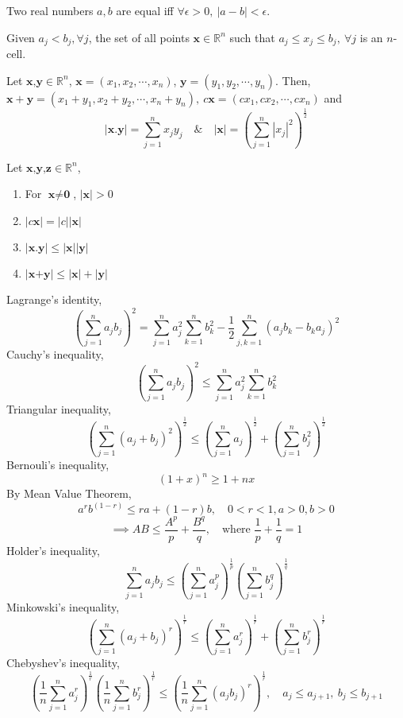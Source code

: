 	\begin{remark}
		Two real numbers $a,b$ are equal iff $\forall \epsilon > 0,\ |a-b|<\epsilon$.
	\end{remark}

	\begin{definition}
		Given $a_j < b_j, \forall j$, the set of all points $\textbf{x} \in \mathbb{R}^n$ such that $a_j \le x_j \le b_j,\ \forall j$ is an $n$-cell.
	\end{definition}

	\begin{definition}
		Let $\textbf{x,y} \in \mathbb{R}^n$, $ \textbf{x} = (x_1, x_2, \cdots, x_n)$, $\textbf{y} = (y_1, y_2, \cdots, y_n)$. Then, $\textbf{x} + \textbf{y} = (x_1 + y_1, x_2 + y_2, \cdots, x_n + y_n),\ c\textbf{x} = (cx_1, cx_2, \cdots, cx_n)$ and
		$$|\textbf{x}.\textbf{y}| = \sum_{j=1}^n x_j y_j \quad \& \quad | \textbf{x} | = \left( \sum_{j=1}^n |x_j|^2 \right)^\frac{1}{2}$$
	\end{definition}

	\begin{remark} Let $\textbf{x,y,z} \in \mathbb{R}^n$,
		\begin{enumerate}
			\item For $\textbf{x} \ne \textbf{0}$, $|\textbf{x}| > 0$
			\item $|c\textbf{x}| = |c||\textbf{x}|$
			\item $|\textbf{x.y}| \le |\textbf{x}||\textbf{y}|$
			\item $|\textbf{x+y}| \le |\textbf{x}|+|\textbf{y}|$
		\end{enumerate}
	\end{remark}

	Lagrange's identity, $$\left( \sum_{j = 1}^n a_jb_j \right)^2 = \sum_{j = 1}^n a_j^2 \sum_{k = 1}^n b_k^2 - \frac{1}{2}\sum_{j,k=1}^n (a_jb_k - b_ka_j)^2$$
	Cauchy's inequality, $$\left( \sum_{j = 1}^n a_jb_j \right)^2 \le \sum_{ j = 1}^n a_j^2 \sum_{k = 1}^n b_k^2$$
	Triangular inequality, $$\left( \sum_{j = 1}^n (a_j + b_j)^2 \right)^\frac{1}{2} \le \left( \sum_{j = 1}^n a_j \right)^\frac{1}{2} + \left( \sum_{j = 1}^n b_j^2 \right)^\frac{1}{2}$$
	Bernouli's inequality, $$(1+x)^n \ge 1+nx$$
	By Mean Value Theorem, $$a^r b^{(1-r)} \le ra + (1-r)b,\quad 0 < r < 1, a > 0, b > 0$$
	$$ \implies AB \le \frac{A^p}{p} + \frac{B^q}{q},\quad \text{where }\frac{1}{p}+\frac{1}{q} = 1 $$
	Holder's inequality, $$\sum_{j = 1}^n a_jb_j \le \left( \sum_{j = 1}^n a_j^p \right)^\frac{1}{p} \left( \sum_{j = 1}^n b_j^q \right)^\frac{1}{q} $$
	Minkowski's inequality, $$\left( \sum_{j = 1}^n (a_j + b_j)^r \right)^\frac{1}{r} \le \left( \sum_{j = 1}^n a_j^r \right)^\frac{1}{r} + \left( \sum_{j = 1}^n b_j^r \right)^\frac{1}{r} $$
	Chebyshev's inequality, $$\left( \frac{1}{n} \sum_{j = 1}^n a_j^r \right)^\frac{1}{r} \left( \frac{1}{n} \sum_{j = 1}^n b_j^r \right)^\frac{1}{r} \le \left( \frac{1}{n} \sum_{j = 1}^n (a_jb_j)^r \right)^\frac{1}{r},\quad a_j \le a_{j+1},\ b_j \le b_{j+1}$$

